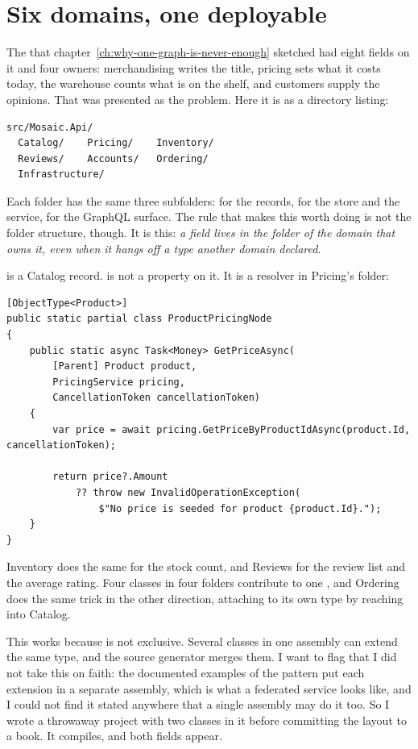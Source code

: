 \section{Six domains, one deployable}
\label{sec:ch02-six-domains}

The  that chapter~\ref{ch:why-one-graph-is-never-enough} sketched
had eight fields on it and four owners: merchandising writes the title,
pricing sets what it costs today, the warehouse counts what is on the shelf, and
customers supply the opinions. That was presented as the problem. Here it is as
a directory listing:

\begin{verbatim}
src/Mosaic.Api/
  Catalog/    Pricing/    Inventory/
  Reviews/    Accounts/   Ordering/
  Infrastructure/
\end{verbatim}

%
Each folder has the same three subfolders:  for the records,
 for the store and the service,  for the GraphQL surface.
The rule that makes this worth doing is not the folder structure, though. It is
this: \emph{a field lives in the folder of the domain that owns it, even when it
hangs off a type another domain declared}.

 is a Catalog record.  is not a property on it.
It is a resolver in Pricing's folder:

\begin{verbatim}
[ObjectType<Product>]
public static partial class ProductPricingNode
{
    public static async Task<Money> GetPriceAsync(
        [Parent] Product product,
        PricingService pricing,
        CancellationToken cancellationToken)
    {
        var price = await pricing.GetPriceByProductIdAsync(product.Id, cancellationToken);

        return price?.Amount
            ?? throw new InvalidOperationException(
                $"No price is seeded for product {product.Id}.");
    }
}
\end{verbatim}

Inventory does the same for the stock count, and Reviews for the review list and
the average rating. Four classes in four folders contribute to one
, and Ordering does the same trick in the other direction,
attaching  to its own  type by reaching into
Catalog.

%
This works because \code{[ObjectType<T>]} is not exclusive. Several classes in
one assembly can extend the same type, and the source generator merges them.
I want to flag that I did not take this on faith: the documented examples of the
pattern put each extension in a separate assembly, which is what a federated
service looks like, and I could not find it stated anywhere that a single
assembly may do it too. So I wrote a throwaway project with two
 classes in it before committing the layout to a
book. It compiles, and both fields appear.

